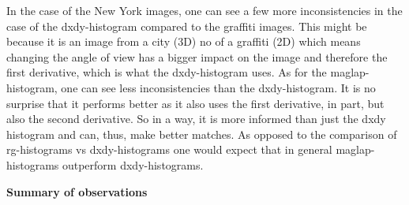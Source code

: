 \documentclass[12pt]{article}
\begin{document}
\begin{enumerate}[a)]
	In the case of the New York images, one can see a few more inconsistencies in the case of the dxdy-histogram compared to the graffiti images. This might be because it is an image from a city (3D) no of a graffiti (2D) which means changing the angle of view has a bigger impact on the image and therefore the first derivative, which is what the dxdy-histogram uses. As for the maglap-histogram, one can see less inconsistencies than the dxdy-histogram. It is no surprise that it performs better as it also uses the first derivative, in part, but also the second derivative. So in a way, it is more informed than just the dxdy histogram and can, thus, make better matches. As opposed to the comparison of rg-histograms vs dxdy-histograms one would expect that in general maglap-histograms outperform dxdy-histograms.
	
	\textbf{Summary of observations}\\

\end{enumerate}

\newpage
\end{document}
